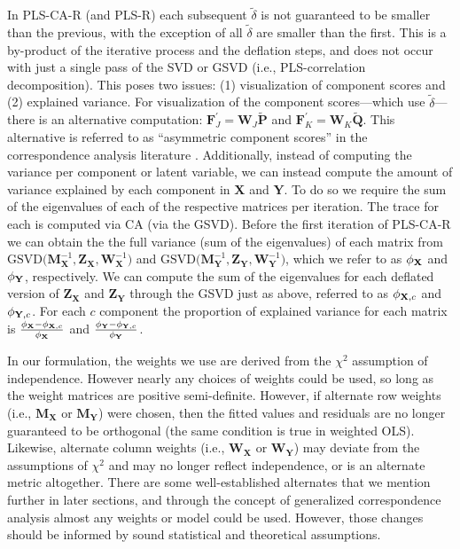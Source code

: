 \documentclass[12pt]{article}
\begin{document}
In PLS-CA-R (and PLS-R) each subsequent \(\widetilde{\delta}\) is not
guaranteed to be smaller than the previous, with the exception of all
\(\widetilde \delta\) are smaller than the first. This is a by-product
of the iterative process and the deflation steps, and does not occur
with just a single pass of the SVD or GSVD (i.e., PLS-correlation
decomposition). This poses two issues: (1) visualization of component
scores and (2) explained variance. For visualization of the component
scores---which use \(\widetilde \delta\)---there is an alternative
computation:
\({\mathbf F}^{'}_{J} = {\mathbf W}_{J}\widetilde{\mathbf P}\) and
\({\mathbf F}^{'}_{K} = {\mathbf W}_{K}\widetilde{\mathbf Q}\). This
alternative is referred to as ``asymmetric component scores'' in the
correspondence analysis literature
\citep{abdi2014correspondence, greenacre1993biplots}. Additionally,
instead of computing the variance per component or latent variable, we
can instead compute the amount of variance explained by each component
in \(\mathbf X\) and \(\mathbf Y\). To do so we require the sum of the
eigenvalues of each of the respective matrices per iteration. The trace
for each is computed via CA (via the GSVD). Before the first iteration
of PLS-CA-R we can obtain the the full variance (sum of the eigenvalues)
of each matrix from
\(\mathrm{GSVD(} {\mathbf M}^{-1}_{\mathbf X}, {\mathbf Z}_{\mathbf X}, {\mathbf W}^{-1}_{\mathbf X} \mathrm{)}\)
and
\(\mathrm{GSVD(} {\mathbf M}^{-1}_{\mathbf Y}, {\mathbf Z}_{\mathbf Y}, {\mathbf W}^{-1}_{\mathbf Y} \mathrm{)}\),
which we refer to as \({\phi}_{\bf X}\) and \({\phi}_{\bf Y}\),
respectively. We can compute the sum of the eigenvalues for each
deflated version of \({\mathbf Z}_{\mathbf X}\) and
\({\mathbf Z}_{\mathbf Y}\) through the GSVD just as above, referred to
as \({\phi}_{{\bf X},c}\) and \({\phi}_{{\bf Y},c}\). For each \(c\)
component the proportion of explained variance for each matrix is
\(\frac{{\phi}_{\bf X} - {\phi}_{{\bf X},c}}{{\phi}_{\bf X}}\) and
\(\frac{{\phi}_{\bf Y} - {\phi}_{{\bf Y},c}}{{\phi}_{\bf Y}}\).

In our formulation, the weights we use are derived from the \(\chi^2\)
assumption of independence. However nearly any choices of weights could
be used, so long as the weight matrices are positive semi-definite.
However, if alternate row weights (i.e., \({\mathbf M}_{\mathbf X}\) or
\({\mathbf M}_{\mathbf Y}\)) were chosen, then the fitted values and
residuals are no longer guaranteed to be orthogonal (the same condition
is true in weighted OLS). Likewise, alternate column weights (i.e.,
\({\mathbf W}_{\mathbf X}\) or \({\mathbf W}_{\mathbf Y}\)) may deviate
from the assumptions of \(\chi^2\) and may no longer reflect
independence, or is an alternate metric altogether. There are some
well-established alternates that we mention further in later sections,
and through the concept of generalized correspondence analysis
\citep{escofier1983analyse, escofier1984analyse} almost any weights or
model could be used. However, those changes should be informed by sound
statistical and theoretical assumptions.
\end{document}
